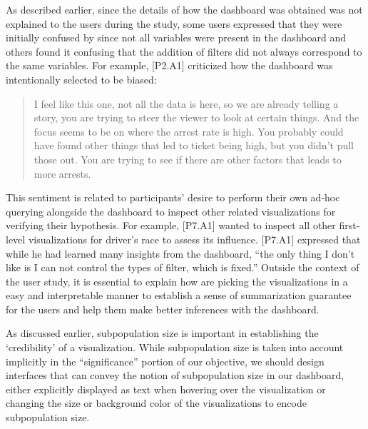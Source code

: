 \par As described earlier, since the details of how the dashboard was obtained was not explained to the users during the study, some users expressed that they were initially confused by \system since not all variables were present in the dashboard and others found it confusing that the addition of filters did not always correspond to the same variables. For example, [P2.A1] criticized how the dashboard was intentionally selected to be biased:
\begin{quote}
I feel like this one, not all the data is here, so we are already telling a story, you are trying to steer the viewer to look at certain things. And the focus seems to be on where the arrest rate is high. You probably could have found other things that led to ticket being high, but you didn't pull those out. You are trying to see if there are other factors that leads to more arrests.
\end{quote}
\npar This sentiment is related to participants' desire to perform their own ad-hoc querying alongside the dashboard to inspect other related visualizations for verifying their hypothesis. For example, [P7.A1] wanted to inspect all other first-level visualizations for driver's race to assess its influence. [P7.A1] expressed that while he had learned many insights from the dashboard, ``the only thing I don't like is I can not control the types of filter, which is fixed.'' Outside the context of the user study, it is essential to explain how \system are picking the visualizations in a easy and interpretable manner to establish a sense of summarization guarantee for the users and help them make better inferences with the dashboard.
\par As discussed earlier, subpopulation size is important in establishing the `credibility' of a visualization. While subpopulation size is taken into account implicitly in the ``significance'' portion of our objective, we should design interfaces that can convey the notion of subpopulation size in our dashboard, either explicitly displayed as text when hovering over the visualization or changing the size or background color of the visualizations to encode subpopulation size.
